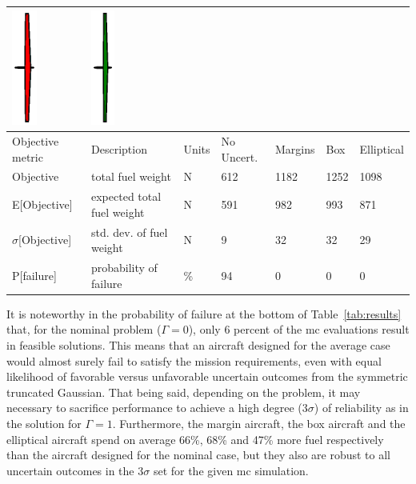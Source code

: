 \begin{table}[!h]
\begin{center}
\begin{tabular}{C{2cm} C{3.8cm} C{1.25cm} C{1.6cm} C{1.6cm} C{1.6cm} C{1.6cm}}
    \includegraphics[trim={9.5cm 1cm 9.5cm 1cm},clip,height=3.8cm]{box.eps} &
    \includegraphics[trim={9.5cm 1cm 9.5cm 1cm},clip,height=3.8cm]{elliptical.eps} \\
\hline
Objective metric & Description & Units & No Uncert. & Margins & Box & Elliptical \\
\hline
Objective & total fuel weight & $\mathrm{N}$ & 612 & 1182 & 1252 & 1098 \\
E[Objective] & expected total fuel weight & $\mathrm{N}$ & 591 & 982 & 993 & 871 \\
$\sigma$[Objective] & std. dev. of fuel weight & $\mathrm{N}$ & 9 & 32 & 32 & 29 \\
P[failure] & probability of failure & \% & 94 & 0 & 0 & 0\\
\hline
\end{tabular}
\end{center}
\end{table}

It is noteworthy in the probability of failure at the bottom of Table~\ref{tab:results} that,
for the nominal problem ($\Gamma = 0$),
only 6 percent of the \gls{mc} evaluations result in feasible solutions.
This means that an aircraft designed for the average case would almost surely
fail to satisfy the mission requirements, even with equal likelihood of favorable versus
unfavorable uncertain outcomes from the symmetric truncated Gaussian.
That being said, depending on the problem, it may necessary to sacrifice
performance to achieve a high degree ($3\sigma$) of
reliability as in the solution for $\Gamma = 1$. Furthermore, the margin aircraft, the box aircraft
and the elliptical aircraft spend on average 66\%, 68\% and 47\% more fuel respectively
than the aircraft designed for the nominal case, but they also are
robust to all uncertain outcomes in the $3\sigma$ set for the given \gls{mc} simulation.

